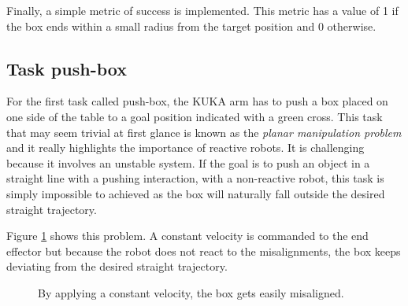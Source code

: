 Finally, a simple metric of success is implemented. This metric has a value of 1 if the box ends within a small radius from the target position and 0 otherwise.

\subsection{Task push-box}
\label{subsection:Push box in a straight line}

For the first task called push-box, the KUKA arm has to push a box placed on one side of the table to a goal position indicated with a green cross. This task that may seem trivial at first glance is known as the \textit{planar manipulation problem} \cite{constant_velocity} and it really highlights the importance of reactive robots. It is challenging because it involves an unstable system. If the goal is to push an object in a straight line with a pushing interaction, with a non-reactive robot, this task is simply impossible to achieved as the box will naturally fall outside the desired straight trajectory. 

 Figure \ref{fig:planar-motion-problem} shows this problem. A constant velocity is commanded to the end effector but because the robot does not react to the misalignments, the box keeps deviating from the desired straight trajectory.


 \begin{figure}[H]
  \centering
  \hspace*{\fill}%
   \hfill
   \hfill
   \hspace*{\fill}%
  \caption{By applying a constant velocity, the box gets easily misaligned.}
  \label{fig:planar-motion-problem}
\end{figure}

